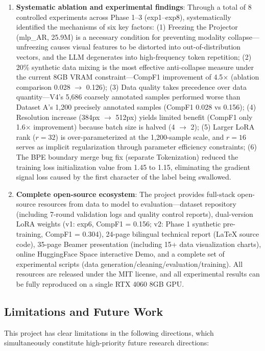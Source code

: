 \begin{enumerate}
    \item \textbf{Systematic ablation and experimental findings}: Through a total of 8 controlled experiments across Phase 1--3 (exp1--exp8), systematically identified the mechanisms of six key factors: (1) Freezing the Projector (mlp\_AR, 25.9M) is a necessary condition for preventing modality collapse---unfreezing causes visual features to be distorted into out-of-distribution vectors, and the LLM degenerates into high-frequency token repetition; (2) 20\% synthetic data mixing is the most effective anti-collapse measure under the current 8GB VRAM constraint---CompF1 improvement of 4.5$\times$ (ablation comparison 0.028 $\to$ 0.126); (3) Data quality takes precedence over data quantity---V4's 5,686 coarsely annotated samples performed worse than Dataset A's 1,200 precisely annotated samples (CompF1 0.028 vs 0.156); (4) Resolution increase (384px $\to$ 512px) yields limited benefit (CompF1 only 1.6$\times$ improvement) because batch size is halved (4 $\to$ 2); (5) Larger LoRA rank ($r=32$) is over-parameterized at the 1,200-sample scale, and $r=16$ serves as implicit regularization through parameter efficiency constraints; (6) The BPE boundary merge bug fix (separate Tokenization) reduced the training loss initialization value from 1.45 to 1.15, eliminating the gradient signal loss caused by the first character of the label being swallowed.

    \item \textbf{Complete open-source ecosystem}: The project provides full-stack open-source resources from data to model to evaluation---dataset repository (including 7-round validation logs and quality control reports), dual-version LoRA weights (v1: exp6, CompF1 = 0.156; v2: Phase 1 synthetic pre-training, CompF1 = 0.304), 24-page bilingual technical report (LaTeX source code), 35-page Beamer presentation (including 15+ data visualization charts), online HuggingFace Space interactive Demo, and a complete set of experimental scripts (data generation/cleaning/evaluation/training). All resources are released under the MIT license, and all experimental results can be fully reproduced on a single RTX 4060 8GB GPU.
\end{enumerate}

\subsection{Limitations and Future Work}

This project has clear limitations in the following directions, which simultaneously constitute high-priority future research directions:

